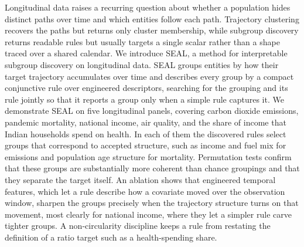 Longitudinal data raises a recurring question about whether a population hides distinct paths over time and which entities follow each path. Trajectory clustering recovers the paths but returns only cluster membership, while subgroup discovery returns readable rules but usually targets a single scalar rather than a shape traced over a shared calendar. We introduce SEAL, a method for interpretable subgroup discovery on longitudinal data. SEAL groups entities by how their target trajectory accumulates over time and describes every group by a compact conjunctive rule over engineered descriptors, searching for the grouping and its rule jointly so that it reports a group only when a simple rule captures it. We demonstrate SEAL on five longitudinal panels, covering carbon dioxide emissions, pandemic mortality, national income, air quality, and the share of income that Indian households spend on health. In each of them the discovered rules select groups that correspond to accepted structure, such as income and fuel mix for emissions and population age structure for mortality. Permutation tests confirm that these groups are substantially more coherent than chance groupings and that they separate the target itself. An ablation shows that engineered temporal features, which let a rule describe how a covariate moved over the observation window, sharpen the groups precisely when the trajectory structure turns on that movement, most clearly for national income, where they let a simpler rule carve tighter groups. A non-circularity discipline keeps a rule from restating the definition of a ratio target such as a health-spending share.

